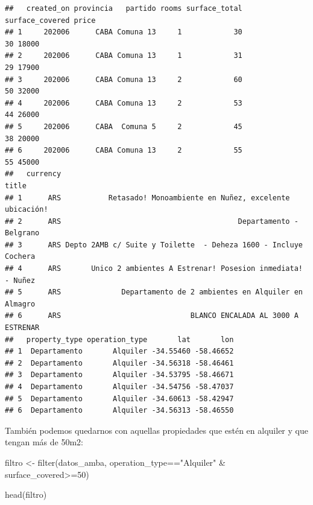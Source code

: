 \documentclass[
  spanish,
]{book}
\newenvironment{Shaded}{\begin{snugshade}}{\end{snugshade}}
\newcommand{\DecValTok}[1]{\textcolor[rgb]{0.00,0.00,0.81}{#1}}
\newcommand{\FunctionTok}[1]{\textcolor[rgb]{0.00,0.00,0.00}{#1}}
\newcommand{\NormalTok}[1]{#1}
\newcommand{\OtherTok}[1]{\textcolor[rgb]{0.56,0.35,0.01}{#1}}
\newcommand{\SpecialCharTok}[1]{\textcolor[rgb]{0.00,0.00,0.00}{#1}}
\newcommand{\StringTok}[1]{\textcolor[rgb]{0.31,0.60,0.02}{#1}}
\begin{document}
\begin{verbatim}
##   created_on provincia   partido rooms surface_total surface_covered price
## 1     202006      CABA Comuna 13     1            30              30 18000
## 2     202006      CABA Comuna 13     1            31              29 17900
## 3     202006      CABA Comuna 13     2            60              50 32000
## 4     202006      CABA Comuna 13     2            53              44 26000
## 5     202006      CABA  Comuna 5     2            45              38 20000
## 6     202006      CABA Comuna 13     2            55              55 45000
##   currency                                                           title
## 1      ARS           Retasado! Monoambiente en Nuñez, excelente ubicación!
## 2      ARS                                         Departamento - Belgrano
## 3      ARS Depto 2AMB c/ Suite y Toilette  - Deheza 1600 - Incluye Cochera
## 4      ARS       Unico 2 ambientes A Estrenar! Posesion inmediata! - Nuñez
## 5      ARS              Departamento de 2 ambientes en Alquiler en Almagro
## 6      ARS                              BLANCO ENCALADA AL 3000 A ESTRENAR
##   property_type operation_type       lat       lon
## 1  Departamento       Alquiler -34.55460 -58.46652
## 2  Departamento       Alquiler -34.56318 -58.46461
## 3  Departamento       Alquiler -34.53795 -58.46671
## 4  Departamento       Alquiler -34.54756 -58.47037
## 5  Departamento       Alquiler -34.60613 -58.42947
## 6  Departamento       Alquiler -34.56313 -58.46550
\end{verbatim}

También podemos quedarnos con aquellas propiedades que estén en alquiler y que tengan más de 50m2:

\begin{Shaded}
\begin{Highlighting}[]
\NormalTok{filtro }\OtherTok{\textless{}{-}} \FunctionTok{filter}\NormalTok{(datos\_amba, operation\_type}\SpecialCharTok{==}\StringTok{"Alquiler"} \SpecialCharTok{\&}\NormalTok{ surface\_covered}\SpecialCharTok{\textgreater{}=}\DecValTok{50}\NormalTok{)}

\FunctionTok{head}\NormalTok{(filtro)}
\end{Highlighting}
\end{Shaded}
\end{document}
